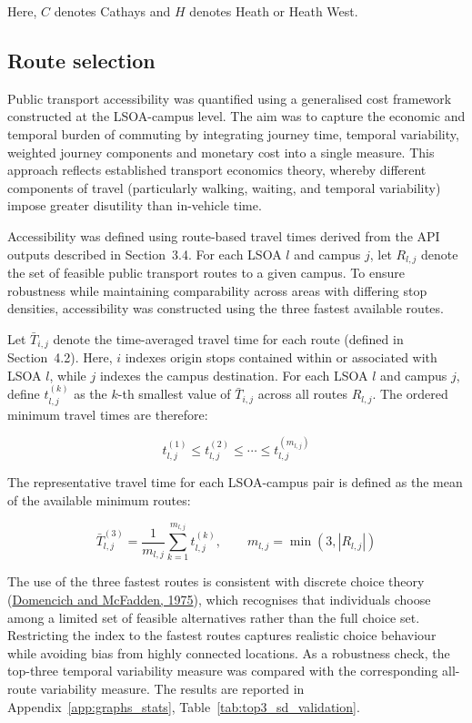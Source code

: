 \documentclass[11pt,a4paper]{article}
\newcommand{\hcite}[2]{\hyperlink{#1}{#2}}
\newcommand{\hcite}[2]{\hyperlink{#1}{#2}}
\begin{document}
Here, \(C\) denotes Cathays and \(H\) denotes Heath or Heath West.

\subsection{Route selection}

Public transport accessibility was quantified using a generalised cost framework constructed at the LSOA-campus level. The aim was to capture the economic and temporal burden of commuting by integrating journey time, temporal variability, weighted journey components and monetary cost into a single measure. This approach reflects established transport economics theory, whereby different components of travel (particularly walking, waiting, and temporal variability) impose greater disutility than in-vehicle time.

Accessibility was defined using route-based travel times derived from the API outputs described in Section~3.4. For each LSOA \(l\) and campus \(j\), let \(R_{l,j}\) denote the set of feasible public transport routes to a given campus. To ensure robustness while maintaining comparability across areas with differing stop densities, accessibility was constructed using the three fastest available routes.

Let \(\bar{T}_{i,j}\) denote the time-averaged travel time for each route (defined in Section~4.2). Here, \(i\) indexes origin stops contained within or associated with LSOA \(l\), while \(j\) indexes the campus destination. For each LSOA \(l\) and campus \(j\), define \(t_{l,j}^{(k)}\) as the \(k\)-th smallest value of \(\bar{T}_{i,j}\) across all routes \(R_{l,j}\). The ordered minimum travel times are therefore:

\[
t_{l,j}^{(1)} \leq t_{l,j}^{(2)} \leq \cdots \leq t_{l,j}^{(m_{l,j})}
\]

The representative travel time for each LSOA-campus pair is defined as the mean of the available minimum routes:

\[
\bar{T}_{l,j}^{(3)} = \frac{1}{m_{l,j}} \sum_{k=1}^{m_{l,j}} t_{l,j}^{(k)}, \qquad m_{l,j} = \min(3, |R_{l,j}|)
\]

The use of the three fastest routes is consistent with discrete choice theory (\hcite{domencich1975}{Domencich and McFadden, 1975}), which recognises that individuals choose among a limited set of feasible alternatives rather than the full choice set. Restricting the index to the fastest routes captures realistic choice behaviour while avoiding bias from highly connected locations. As a robustness check, the top-three temporal variability measure was compared with the corresponding all-route variability measure. The results are reported in Appendix~\ref{app:graphs_stats}, Table~\ref{tab:top3_sd_validation}.
\end{document}
